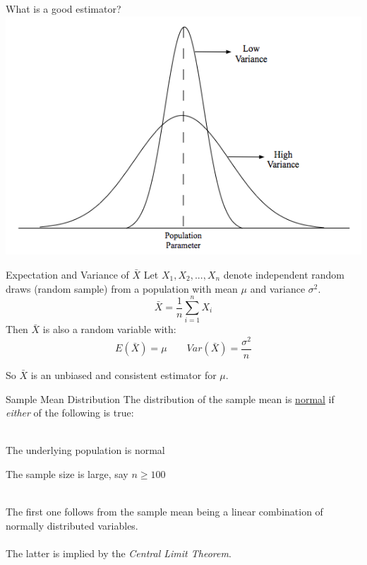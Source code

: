 \documentclass{./../div_teaching_slides}
\begin{document}
\begin{frame}{What is a good estimator?}
\centering
\includegraphics[scale=0.6]{effeciency.png}
\end{frame}


\begin{frame}{Expectation and Variance of $\bar{X}$}
Let $X_1,X_2,...,X_n$ denote independent random draws (random sample) from a population with mean $\mu$ and variance $\sigma^2$. 
$$ \bar{X} = \frac{1}{n} \sum_{i=1}^n X_i $$
Then $\bar{X}$ is also a random variable with:
$$E(\bar{X}) = \mu \quad \quad  Var(\bar{X}) = \frac{\sigma^2}{n} $$ 

So $\bar{X}$ is an unbiased and consistent estimator for $\mu$.
\end{frame}

\begin{frame}{Sample Mean Distribution}
The distribution of the sample mean is \underline{normal} if \textit{either} of the following is true: \\~\\
\begin{witemize}
  \item The underlying population is normal
  \item The sample size is large, say $n\geq 100$ \\~\\
\end{witemize}
The first one follows from the sample mean being a linear combination of normally distributed variables. \\~\\

The latter is implied by the \textit{Central Limit Theorem}. 
\end{frame}
\end{document}
